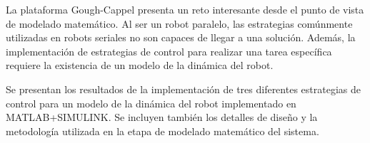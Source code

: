 La plataforma Gough-Cappel presenta un reto interesante desde el punto de vista de modelado matemático.
Al ser un robot paralelo, las estrategias comúnmente utilizadas en robots seriales no son capaces de llegar a una solución.
Además, la implementación de estrategias de control para realizar una tarea específica requiere la existencia de un modelo de la dinámica del robot.

Se presentan los resultados de la implementación de tres diferentes estrategias de control para un modelo de la dinámica del robot implementado en MATLAB+SIMULINK.
Se incluyen también los detalles de diseño y la metodología utilizada en la etapa de modelado matemático del sistema.